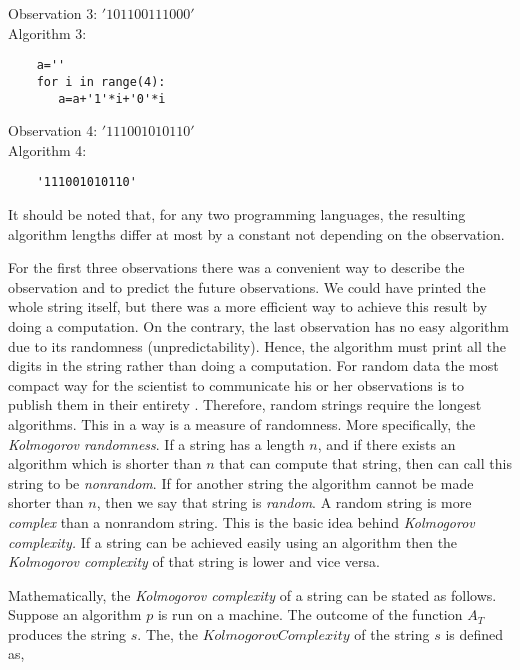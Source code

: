 \documentclass[]{article}
\begin{document}
\newpage
\vspace{5pt}
\noindent Observation 3: $'101100111000'$ \\
Algorithm 3: 
\vspace*{-3mm}
\begin{verbatim}
	a=''
	for i in range(4):
	   a=a+'1'*i+'0'*i
\end{verbatim}

\vspace{5pt}
\noindent Observation 4: $'111001010110'$ \\
Algorithm 4: 
\vspace*{-2mm}
\begin{verbatim}
	'111001010110'
\end{verbatim}

It should be noted that, for any two programming languages, the resulting algorithm lengths differ at most by a constant not depending on the observation. 

For the first three observations there was a convenient way to describe the observation and to predict the future observations. We could have printed the whole string itself, but there was a more efficient way to achieve this result by doing a computation. On the contrary, the last observation has no easy algorithm due to its randomness (unpredictability). Hence, the algorithm must print all the digits in the string rather than doing a computation. For random data the most compact way for the scientist to communicate his or her observations is to publish them in their entirety \cite{victor}. Therefore, random strings require the longest algorithms. This in a way is a measure of randomness. More specifically, the \emph{Kolmogorov randomness}. If a string has a length $n$, and if there exists an algorithm which is shorter than $n$ that can compute that string, then can call this string to be \emph{nonrandom}. If for another string the algorithm cannot be made shorter than $n$, then we say that string is \emph{random}. A random string is more \emph{complex} than a nonrandom string. This is the basic idea behind \emph{Kolmogorov complexity.} If a string can be achieved easily using an algorithm then the \emph{Kolmogorov complexity} of that string is lower and vice versa. 

Mathematically, the \emph{Kolmogorov complexity} of a string can be stated as follows. Suppose an algorithm $p$ is run on a machine. The outcome of the function $A_T$ produces the string $s$. The, the $Kolmogorov Complexity$ of the string $s$ is defined as,
\end{document}
